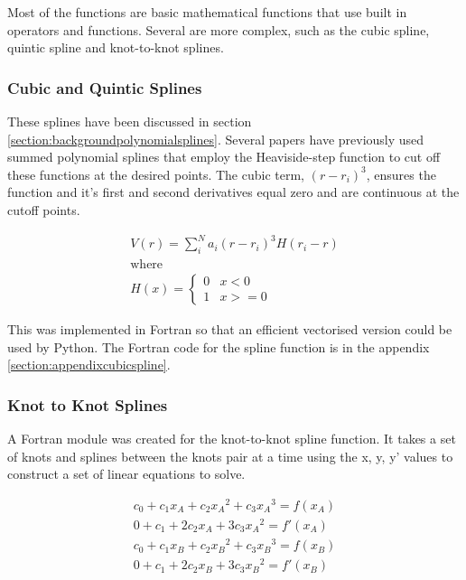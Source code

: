 Most of the functions are basic mathematical functions that use built in operators and functions.  Several are more complex, such as the cubic spline, quintic spline and knot-to-knot splines.


\subsubsection{Cubic and Quintic Splines}

These splines have been discussed in section \ref{section:backgroundpolynomialsplines}.  Several papers have previously used summed polynomial splines that employ the Heaviside-step function to cut off these functions at the desired points.  The cubic term, $(r - r_i)^3$, ensures the function and it's first and second derivatives equal zero and are continuous at the cutoff points.  

\begin{equation}
\begin{split}
V(r) = \sum_i^N a_i (r - r_i)^3 H(r_i - r) \\
\text{where } \\
H(x) = \left\{ \begin{matrix} 0 & x<0 \\  1 & x >= 0 \end{matrix} \right . 
\end{split}
\label{eq:cubicSpline}
\end{equation}

This was implemented in Fortran so that an efficient vectorised version could be used by Python.  The Fortran code for the spline function is in the appendix \ref{section:appendixcubicspline}.


\subsubsection{Knot to Knot Splines}

A Fortran module was created for the knot-to-knot spline function.  It takes a set of knots and splines between the knots pair at a time using the x, y, y' values to construct a set of linear equations to solve. 

\begin{equation}
  \begin{split}
    c_0 + c_1 x_A + c_2 {x_A}^2 + c_3 {x_A}^3 = f(x_A) \\
    0 + c_1 + 2 c_2 {x_A} + 3 c_3 {x_A}^2 = f'(x_A) \\
    c_0 + c_1 x_B + c_2 {x_B}^2 + c_3 {x_B}^3 = f(x_B) \\
    0 + c_1 + 2 c_2 {x_B} + 3 c_3 {x_B}^2 = f'(x_B) 
  \end{split}
  \label{eq:eqSplineThreeEquations}
\end{equation}


